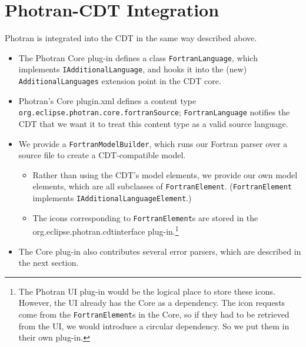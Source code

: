 \section{Photran-CDT Integration}

Photran is integrated into the CDT in the same way described above.
\begin{itemize}

\item The Photran Core plug-in
defines a class \texttt{FortranLanguage}, which implements
\texttt{IAdditionalLanguage}, and hooks it into the (new)
\texttt{AdditionalLanguages} extension point in the CDT core.

\item Photran's Core plugin.xml defines a content type
\texttt{org.eclipse.photran.core.fortranSource}; \texttt{FortranLanguage}
notifies the CDT that we want it to treat this content type as a valid
source language.

\item We provide a \texttt{FortranModelBuilder}, which
runs our Fortran parser over a source file to create a CDT-compatible
model.

\begin{itemize}

\item Rather than using the CDT's model elements, we provide our own
model elements, which are all subclasses of \texttt{FortranElement}.
(\texttt{FortranElement} implements \texttt{IAdditionalLanguageElement}.)

\item The icons corresponding to \texttt{FortranElement}s
are stored in the org.eclipse.photran.cdtinterface plug-in.\footnote{
The Photran UI plug-in would be the logical place to store these icons.
However, the UI already has the Core as a dependency.  The icon requests
come from the \texttt{FortranElement}s in the Core, so if they had to be
retrieved from the UI, we would introduce a circular dependency.  So we put
them in their own plug-in.}

\end{itemize}

\item The Core plug-in also contributes several error parsers,
which are described in the next section.

\end{itemize}
